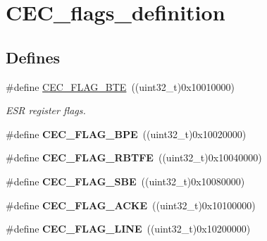 \hypertarget{group__CEC__flags__definition}{
\section{CEC\_\-flags\_\-definition}
\label{group__CEC__flags__definition}
}
\subsection*{Defines}
\begin{DoxyCompactItemize}
\item 
\hypertarget{group__CEC__flags__definition_ga66e91438a7df5d00db3c5410d8f7d456}{
\#define \hyperlink{group__CEC__flags__definition_ga66e91438a7df5d00db3c5410d8f7d456}{CEC\_\-FLAG\_\-BTE}~((uint32\_\-t)0x10010000)}
\label{group__CEC__flags__definition_ga66e91438a7df5d00db3c5410d8f7d456}

\begin{DoxyCompactList}\small\item\em ESR register flags. \item\end{DoxyCompactList}\item 
\hypertarget{group__CEC__flags__definition_gaf2a5d5dcbc57fc0cf7cfa988533a2a09}{
\#define {\bfseries CEC\_\-FLAG\_\-BPE}~((uint32\_\-t)0x10020000)}
\label{group__CEC__flags__definition_gaf2a5d5dcbc57fc0cf7cfa988533a2a09}

\item 
\hypertarget{group__CEC__flags__definition_gafdfca815014dee4a458083337795c336}{
\#define {\bfseries CEC\_\-FLAG\_\-RBTFE}~((uint32\_\-t)0x10040000)}
\label{group__CEC__flags__definition_gafdfca815014dee4a458083337795c336}

\item 
\hypertarget{group__CEC__flags__definition_gac77db62c05af2462ed3f1b64cef2e136}{
\#define {\bfseries CEC\_\-FLAG\_\-SBE}~((uint32\_\-t)0x10080000)}
\label{group__CEC__flags__definition_gac77db62c05af2462ed3f1b64cef2e136}

\item 
\hypertarget{group__CEC__flags__definition_ga1583b7a221e54f2f19cb121bf310547c}{
\#define {\bfseries CEC\_\-FLAG\_\-ACKE}~((uint32\_\-t)0x10100000)}
\label{group__CEC__flags__definition_ga1583b7a221e54f2f19cb121bf310547c}

\item 
\hypertarget{group__CEC__flags__definition_gaf751970725df12976dc6c8356910143a}{
\#define {\bfseries CEC\_\-FLAG\_\-LINE}~((uint32\_\-t)0x10200000)}
\label{group__CEC__flags__definition_gaf751970725df12976dc6c8356910143a}


\end{DoxyCompactItemize}
